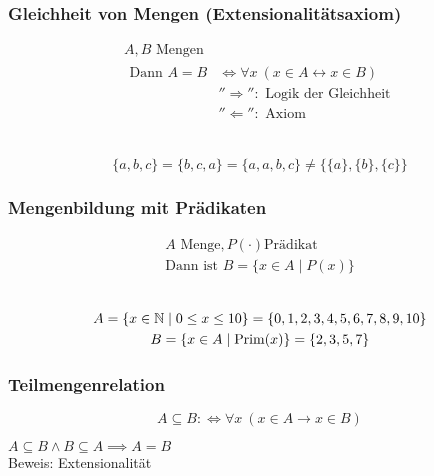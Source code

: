 \subsubsection{Gleichheit von Mengen (Extensionalitätsaxiom)}
\begin{gather*}
	A , B \text{ Mengen} \\
	\begin{aligned}
		\text{Dann } A = B	&\iff \forall x~( x \in A \leftrightarrow x \in B ) \\
						&''\Rightarrow'': \text{ Logik der Gleichheit} \\
						&''\Leftarrow'': \text{ Axiom}
	\end{aligned}
\end{gather*}\\
\begin{bsp*}
	\[ \{ a , b , c \} = \{ b , c , a \} = \{ a , a , b , c \} \neq \{ \{ a \} , \{ b \} , \{ c \} \} \]
\end{bsp*}

\subsubsection{Mengenbildung mit Prädikaten}
\begin{gather*}
	A \text{ Menge}, P( \cdot ) \text{Prädikat} \\
	\text{Dann ist } B = \{ x \in A \mid P( x ) \}
\end{gather*} \\
\begin{bsp*}
	\begin{gather*}
		A = \{ x \in \mathbb{N} \mid 0 \leq x \leq 10 \} = \{ 0 , 1 , 2 , 3 , 4 , 5 , 6 , 7 , 8 , 9 , 10 \} \\
		B = \{ x \in A \mid \operatorname{Prim}( x ) \} = \{ 2 , 3 , 5 , 7 \}
	\end{gather*}
\end{bsp*}

\subsubsection{Teilmengenrelation}
\[ A \subseteq B : \iff \forall x~( x \in A \rightarrow x \in B ) \]
\begin{satz*}
	$A \subseteq B \wedge B \subseteq A \implies A = B$ \\
	Beweis: Extensionalität
\end{satz*}

